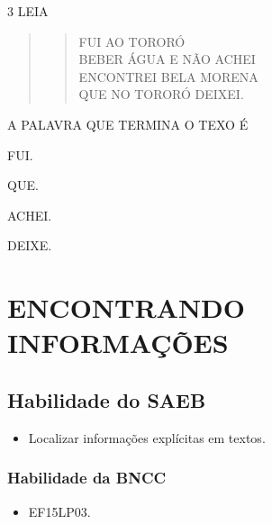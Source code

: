 \num{3} LEIA

\begin{quote}
\begin{verse}
FUI AO TORORÓ\\
BEBER ÁGUA E NÃO ACHEI\\
ENCONTREI BELA MORENA\\
QUE NO TORORÓ DEIXEI.
\end{verse}
\end{quote}

A PALAVRA QUE TERMINA O TEXO É

\begin{escolha}
\item FUI.

\item QUE.

\item ACHEI.

\item DEIXE.
\end{escolha}

\chapter{ENCONTRANDO INFORMAÇÕES}

\section{Habilidade do SAEB }

\begin{itemize}
\item Localizar informações explícitas em textos.
\end{itemize}

\subsection{Habilidade da BNCC}

\begin{itemize}
\item EF15LP03.
\end{itemize}

